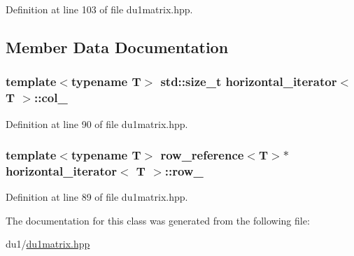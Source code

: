 Definition at line 103 of file du1matrix.\-hpp.



\subsection{Member Data Documentation}
\hypertarget{classhorizontal__iterator_aaabc9b0ce0387ee55a7663dfb87bfb93}{
\subsubsection[{col\-\_\-}]{\setlength{\rightskip}{0pt plus 5cm}template$<$typename T$>$ std\-::size\-\_\-t {\bf horizontal\-\_\-iterator}$<$ T $>$\-::col\-\_\-\hspace{0.3cm}{\ttfamily [protected]}}}\label{classhorizontal__iterator_aaabc9b0ce0387ee55a7663dfb87bfb93}


Definition at line 90 of file du1matrix.\-hpp.

\hypertarget{classhorizontal__iterator_a29e59ea8f9dcb2a05ca56673636faf77}{
\subsubsection[{row\-\_\-}]{\setlength{\rightskip}{0pt plus 5cm}template$<$typename T$>$ {\bf row\-\_\-reference}$<$T$>$$\ast$ {\bf horizontal\-\_\-iterator}$<$ T $>$\-::row\-\_\-\hspace{0.3cm}{\ttfamily [protected]}}}\label{classhorizontal__iterator_a29e59ea8f9dcb2a05ca56673636faf77}


Definition at line 89 of file du1matrix.\-hpp.



The documentation for this class was generated from the following file\-:\begin{DoxyCompactItemize}
\item 
du1/\hyperlink{du1matrix_8hpp}{du1matrix.\-hpp}\end{DoxyCompactItemize}
